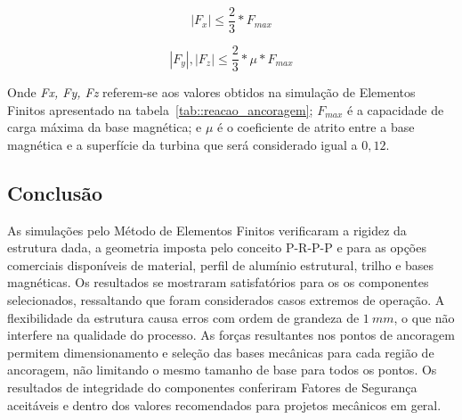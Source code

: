  \begin{equation*}
	|F_{x}|\leq\frac{2}{3}*F_{max}
\end{equation*}

 \begin{equation*}
	|F_{y}|,|F_{z}|\leq\frac{2}{3}*\mu*F_{max}
\end{equation*}

Onde \textit{Fx, Fy, Fz} referem-se aos valores obtidos na simulação de
Elementos Finitos apresentado na tabela~\ref{tab::reacao_ancoragem};
$F_{max}$ é a capacidade de carga máxima da base magnética; e $\mu$ é o
coeficiente de atrito entre a base magnética e a superfície da turbina que será
considerado igual a $0,12$.

\subsection{Conclusão}
As simulações pelo Método de Elementos Finitos verificaram a rigidez da
estrutura dada, a geometria imposta pelo conceito P-R-P-P e para as opções
comerciais disponíveis de material, perfil de alumínio estrutural, trilho e bases
magnéticas.
Os resultados se mostraram satisfatórios para os os componentes selecionados,
ressaltando que foram considerados casos extremos de operação. A flexibilidade
da estrutura causa erros com ordem de grandeza de $1~mm$, o que não interfere na
qualidade do processo.
As forças resultantes nos pontos de ancoragem permitem dimensionamento e seleção
das bases mecânicas para cada região de ancoragem, não limitando o mesmo tamanho
de base para todos os pontos.
Os resultados de integridade do componentes conferiram Fatores de Segurança
aceitáveis e dentro dos valores recomendados para projetos mecânicos em geral.
